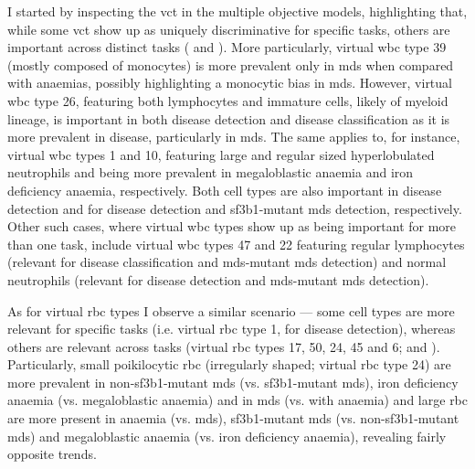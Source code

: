 I started by inspecting the \ac{vct} in the multiple objective models, highlighting that, while some \ac{vct} show up as uniquely discriminative for specific tasks, others are important across distinct tasks ( and ). More particularly, virtual \ac{wbc} type 39 (mostly composed of monocytes) is more prevalent only in \ac{mds} when compared with anaemias, possibly highlighting a monocytic bias in \ac{mds}. However, virtual \ac{wbc} type 26, featuring both lymphocytes and immature cells, likely of myeloid lineage, is important in both disease detection and disease classification as it is more prevalent in disease, particularly in \ac{mds}. The same applies to, for instance, virtual \ac{wbc} types 1 and 10, featuring large and regular sized hyperlobulated neutrophils and being more prevalent in megaloblastic anaemia and iron deficiency anaemia, respectively. Both cell types are also important in disease detection and for disease detection and \ac{sf3b1}-mutant \ac{mds} detection, respectively. Other such cases, where virtual \ac{wbc} types show up as being important for more than one task, include virtual \ac{wbc} types 47 and 22 featuring regular lymphocytes (relevant for disease classification and \ac{mds}-mutant \ac{mds} detection) and normal neutrophils (relevant for disease detection and \ac{mds}-mutant \ac{mds} detection). 

\begin{figure}[!ht]
    \label{fig:mile-vice-multi-objective-effects}
\end{figure}

\begin{figure}[!ht]
    \label{fig:wbc-mo-examples}
\end{figure}

As for virtual \ac{rbc} types I observe a similar scenario --- some cell types are more relevant for specific tasks (i.e. virtual \ac{rbc} type 1, for disease detection), whereas others are relevant across tasks (virtual \ac{rbc} types 17, 50, 24, 45 and 6;  and ). Particularly, small poikilocytic \ac{rbc} (irregularly shaped; virtual \ac{rbc} type 24) are more prevalent in non-\ac{sf3b1}-mutant \ac{mds} (vs. \ac{sf3b1}-mutant \ac{mds}), iron deficiency anaemia (vs. megaloblastic anaemia) and in \ac{mds} (vs. with anaemia) and large \ac{rbc} are more present in anaemia (vs. \ac{mds}), \ac{sf3b1}-mutant \ac{mds} (vs. non-\ac{sf3b1}-mutant \ac{mds}) and megaloblastic anaemia (vs. iron deficiency anaemia), revealing fairly opposite trends. 

